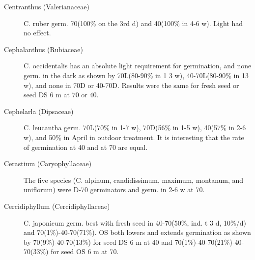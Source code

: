 \begin{description}
\item [Centranthus (Valerianaceae)] C. ruber germ. 70(100\% on the 3rd d) and
40(100\% in 4-6 w). Light had no effect.
\item [Cephalanthus (Rubiaceae)] C. occidentalis has an absolute light
requirement for germination, and none germ. in the dark as shown by 70L(80-90\% in 1
3 w), 40-70L(80-90\% in 13 w), and none in 70D or 40-70D. Results were the same
for fresh seed or seed DS 6 m at 70 or 40.
\item [Cephelarla (Dipsaceae)] C. leucantha germ. 70L(70\% in 1-7 w), 70D(56\%
in 1-5 w), 40(57\% in 2-6 w), and 50\% in April in outdoor treatment. It is interesting that
the rate of germination at 40 and at 70 are equal.
\item [Cerastium (Caryophyllaceae)] The five species (C. alpinum,
candidissimum, maximum, montanum, and uniflorum) were D-70 germinators and
germ. in 2-6 w at 70.
\item [Cercidiphyllum (Cercidiphyllaceae)] C. japonicum germ. best with fresh
seed in 40-70(50\%, ind. t 3 d, 10\%/d) and 70(1\%)-40-70(71\%). OS both lowers and
extends germination as shown by 70(9\%)-40-70(13\%) for seed DS 6 m at 40 and
70(1\%)-40-70(21\%)-40-70(33\%) for seed OS 6 m at 70.


\end{description}
